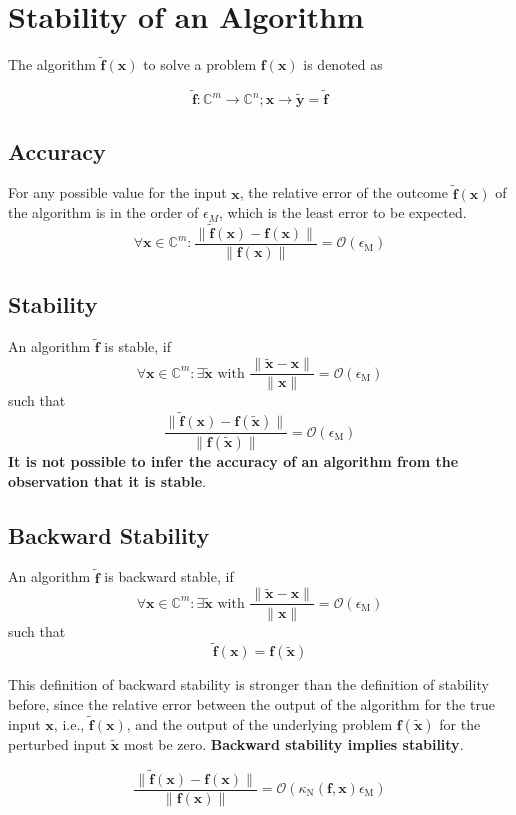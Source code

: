\documentclass[english]{latex4ei/latex4ei_sheet}
\begin{document}
\section{Stability of an Algorithm}
\begin{sectionbox}
The algorithm $\mathbf{\tilde{f}}(\mathbf{x})$ to solve a problem $\mathbf{f}(\mathbf{x})$ is denoted as

$$\mathbf{\tilde{f}}: \mathbb{C}^m \to \mathbb{C}^n; \mathbf{x}\to \tilde{\mathbf{y}} = \mathbf{\tilde{f}}$$

\subsection{Accuracy}
For any possible value for the input $\mathbf{x}$, the relative error of the outcome $\mathbf{\tilde{f}}(\mathbf{x})$ of the algorithm is in the order of $\epsilon_M$, which is the least error to be expected.
$$\forall \mathbf{x}\in\mathbb{C}^{m}:\frac{\parallel \mathbf{\tilde{f}}(\mathbf{x}) -\mathbf{f}(\mathbf{x})\parallel}{\parallel\mathbf{f}(\mathbf{x}) \parallel} = \mathcal{O}(\epsilon_\text{M})$$

\subsection{Stability}
An algorithm $\tilde{\mathbf{f}}$ is stable, if
$$\forall \mathbf{x} \in \mathbb{C}^{m}: \exists \mathbf{\tilde{x}} \text{ with } \frac{\parallel \mathbf{\tilde{x}} - \mathbf{x}\parallel}{\parallel \mathbf{x}\parallel} = \mathcal{O}(\epsilon_\text{M})$$
such that
$$\frac{\parallel \mathbf{\tilde{f}}(\mathbf{x}) -\mathbf{f}(\mathbf{\tilde{x}})\parallel}{\parallel\mathbf{f}(\mathbf{\tilde{x}}) \parallel} = \mathcal{O}(\epsilon_\text{M})$$
\textbf{It is not possible to infer the accuracy of an algorithm from the observation that it is stable}. 

\subsection{Backward Stability}
An algorithm $\tilde{\mathbf{f}}$ is backward stable, if
$$\forall \mathbf{x} \in \mathbb{C}^{m}: \exists \mathbf{\tilde{x}} \text{ with } \frac{\parallel \mathbf{\tilde{x}} - \mathbf{x}\parallel}{\parallel \mathbf{x}\parallel} = \mathcal{O}(\epsilon_\text{M})$$
such that
$$\tilde{\mathbf{f}}(\mathbf{x}) = \mathbf{f}(\tilde{\mathbf{x}})$$

This definition of backward stability is stronger than the definition of stability before, since the relative error between the output of the algorithm for the true input $\mathbf{x}$, i.e., $\tilde{\mathbf{f}}(\mathbf{x})$, and the output of the underlying problem $\mathbf{f}(\tilde{\mathbf{x}})$ for the perturbed input $\tilde{\mathbf{x}}$ most be zero. \textbf{Backward stability implies stability}.

$$\frac{\parallel \mathbf{\tilde{f}}(\mathbf{x}) -\mathbf{f}(\mathbf{x})\parallel}{\parallel\mathbf{f}(\mathbf{x}) \parallel} = \mathcal{O}(\kappa_\text{N}(\mathbf{f},\mathbf{x})\epsilon_\text{M})$$
\end{sectionbox}
\end{document}
